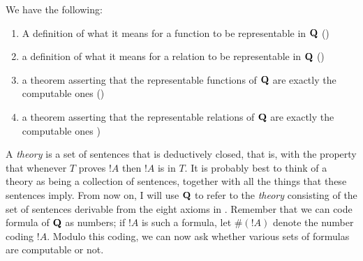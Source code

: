 \documentclass[../../../include/open-logic-section]{subfiles}
\begin{document}


We have the following:
\begin{enumerate}
\item A definition of what it means for a function to be representable
  in $\mathbf{Q}$ ()
\item a definition of what it means for a relation to be representable
  in $\mathbf{Q}$ ()
\item a theorem asserting that the representable functions of $\mathbf{Q}$
  are exactly the computable ones
  ()
\item a theorem asserting that the representable relations of $\mathbf{Q}$
  are exactly the computable ones
  )
\end{enumerate}

A {\em theory} is a set of sentences that is deductively closed, that
is, with the property that whenever $T$ proves $!A$ then $!A$ is in
$T$. It is probably best to think of a theory as being a collection of
sentences, together with all the things that these sentences imply.
From now on, I will use $\mathbf{Q}$ to refer to the {\em theory}
consisting of the set of sentences derivable from the eight axioms in
.  Remember that we can code formula of $\mathbf{Q}$
as numbers; if $!A$ is such a formula, let $\#(!A)$ denote the number
coding $!A$. Modulo this coding, we can now ask whether various sets
of formulas are computable or not.
\end{document}
